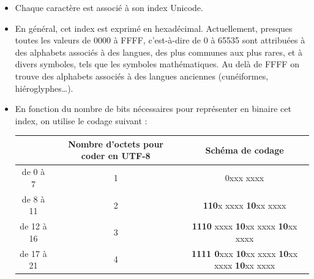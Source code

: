 \begin{itemize}
    \item Chaque caractère est associé à son index Unicode.
    \item 	En général, cet index est exprimé en hexadécimal.
          Actuellement, presques toutes les valeurs de 0000 à FFFF, c'est-à-dire de 0 à 65535 sont
          attribuées à des \og alphabets \fg{} associés à des langues, des plus communes aux plus rares, et à divers symboles, tels que les
          symboles mathématiques.
          Au delà de FFFF on trouve des alphabets associés à des langues anciennes (cunéiformes, hiéroglyphes\ldots).
    \item  En fonction du nombre de bits nécessaires pour représenter en binaire  cet index, on utilise le codage suivant :\\

          \begin{center}
              {\scriptsize
                  \begin{tabular}{|c|c|c|}
                      \hline
                      \rowcolor{UGLiOrange}{\boxfont\color{white}Nombre de bits de l'index} & {\boxfont\color{white}Nombre d'octets pour coder en UTF-8} & {\boxfont\color{white}Schéma de codage}                                                           \\
                      \hline
                      de 0 à 7                  & 1                                   & 0xxx xxxx                                                                   \\
                      \hline
                      de 8 à 11                 & 2                                   & \textbf{110}x xxxx \textbf{10}xx xxxx                                       \\
                      \hline
                      de 12 à 16                & 3                                   & \textbf{1110} xxxx \textbf{10}xx xxxx \textbf{10}xx xxxx                    \\
                      \hline
                      de 17 à 21                & 4                                   & \textbf{1111 0}xxx \textbf{10}xx xxxx \textbf{10}xx xxxx \textbf{10}xx xxxx \\
                      \hline
                  \end{tabular} }
              \normalsize
          \end{center}
          \vspace{1em}
\end{itemize}
